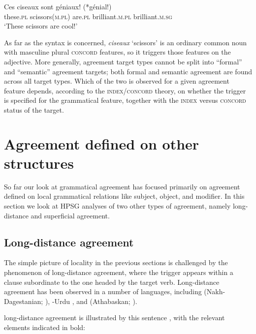 \documentclass[output=paper
 	        ,biblatex
                ,babelshorthands
                ,newtxmath
                ,draftmode
                ,colorlinks, citecolor=brown
]{langscibook}
\begin{document}
\begin{exe} 
\ex\label{ciseaux}
\gll   Ces	ciseaux	sont	g\'{e}niaux!	(*g\'{e}nial!) \\
		these.\textsc{pl}	scissors(\textsc{m.pl})	are.\textsc{pl} 	brilliant.\textsc{m.pl}	\hphantom{(*}brilliant.\textsc{m.sg} \\
\glt		`These scissors are cool!’ 
\end{exe}

\noindent
As far as the syntax is concerned, \textit{ciseaux} `scissors’ is an ordinary common noun with masculine plural \textsc{concord} features, so it triggers those features on the adjective.  More generally, agreement target types cannot be split into ``formal'' and ``semantic'' agreement targets; both formal and semantic agreement are found across all target types.  Which of the two is observed for a given agreement feature depends, according to the  \textsc{index/concord}  theory,  on whether the trigger is specified for the grammatical feature, together with the  \textsc{index}  versus  \textsc{concord}  status of the target.  
 

\section{Agreement defined on other structures}
So far our look at grammatical agreement has focused primarily on agreement defined on local grammatical relations like subject, object, and modifier.  In this section we look at HPSG analyses of two other types of agreement, namely long-distance and superficial agreement.  

\subsection{Long-distance agreement}
\label{LDA}

The simple picture of locality in the previous sections is challenged by the phenomenon of long-distance agreement, where the trigger appears within a clause subordinate to the one headed by the target verb.  Long-distance agreement has been observed in a number of languages, including  (Nakh-Dagestanian; \citealt{polinsky+potsdam:2001}), -Urdu \citep{bhatt:2005}, and  (Athabaskan; \citealt{bruening:2001,LeSourd:2018}).  

 long-distance agreement is illustrated by this sentence \citep[example\,(5)]{LeSourd:2018}, with the relevant elements indicated in bold:
\end{document}
